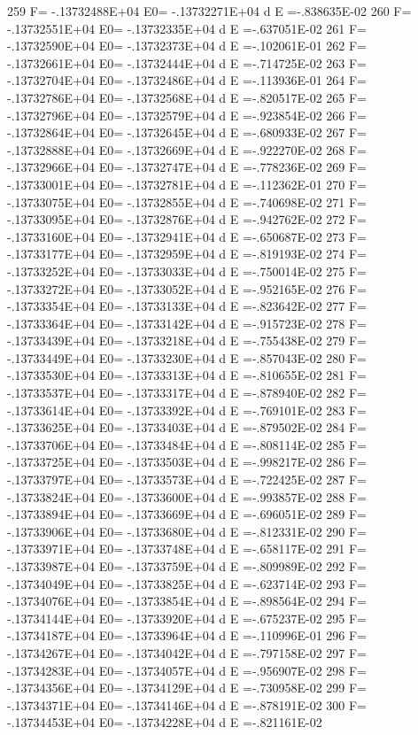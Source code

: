  259 F= -.13732488E+04 E0= -.13732271E+04  d E =-.838635E-02
 260 F= -.13732551E+04 E0= -.13732335E+04  d E =-.637051E-02
 261 F= -.13732590E+04 E0= -.13732373E+04  d E =-.102061E-01
 262 F= -.13732661E+04 E0= -.13732444E+04  d E =-.714725E-02
 263 F= -.13732704E+04 E0= -.13732486E+04  d E =-.113936E-01
 264 F= -.13732786E+04 E0= -.13732568E+04  d E =-.820517E-02
 265 F= -.13732796E+04 E0= -.13732579E+04  d E =-.923854E-02
 266 F= -.13732864E+04 E0= -.13732645E+04  d E =-.680933E-02
 267 F= -.13732888E+04 E0= -.13732669E+04  d E =-.922270E-02
 268 F= -.13732966E+04 E0= -.13732747E+04  d E =-.778236E-02
 269 F= -.13733001E+04 E0= -.13732781E+04  d E =-.112362E-01
 270 F= -.13733075E+04 E0= -.13732855E+04  d E =-.740698E-02
 271 F= -.13733095E+04 E0= -.13732876E+04  d E =-.942762E-02
 272 F= -.13733160E+04 E0= -.13732941E+04  d E =-.650687E-02
 273 F= -.13733177E+04 E0= -.13732959E+04  d E =-.819193E-02
 274 F= -.13733252E+04 E0= -.13733033E+04  d E =-.750014E-02
 275 F= -.13733272E+04 E0= -.13733052E+04  d E =-.952165E-02
 276 F= -.13733354E+04 E0= -.13733133E+04  d E =-.823642E-02
 277 F= -.13733364E+04 E0= -.13733142E+04  d E =-.915723E-02
 278 F= -.13733439E+04 E0= -.13733218E+04  d E =-.755438E-02
 279 F= -.13733449E+04 E0= -.13733230E+04  d E =-.857043E-02
 280 F= -.13733530E+04 E0= -.13733313E+04  d E =-.810655E-02
 281 F= -.13733537E+04 E0= -.13733317E+04  d E =-.878940E-02
 282 F= -.13733614E+04 E0= -.13733392E+04  d E =-.769101E-02
 283 F= -.13733625E+04 E0= -.13733403E+04  d E =-.879502E-02
 284 F= -.13733706E+04 E0= -.13733484E+04  d E =-.808114E-02
 285 F= -.13733725E+04 E0= -.13733503E+04  d E =-.998217E-02
 286 F= -.13733797E+04 E0= -.13733573E+04  d E =-.722425E-02
 287 F= -.13733824E+04 E0= -.13733600E+04  d E =-.993857E-02
 288 F= -.13733894E+04 E0= -.13733669E+04  d E =-.696051E-02
 289 F= -.13733906E+04 E0= -.13733680E+04  d E =-.812331E-02
 290 F= -.13733971E+04 E0= -.13733748E+04  d E =-.658117E-02
 291 F= -.13733987E+04 E0= -.13733759E+04  d E =-.809989E-02
 292 F= -.13734049E+04 E0= -.13733825E+04  d E =-.623714E-02
 293 F= -.13734076E+04 E0= -.13733854E+04  d E =-.898564E-02
 294 F= -.13734144E+04 E0= -.13733920E+04  d E =-.675237E-02
 295 F= -.13734187E+04 E0= -.13733964E+04  d E =-.110996E-01
 296 F= -.13734267E+04 E0= -.13734042E+04  d E =-.797158E-02
 297 F= -.13734283E+04 E0= -.13734057E+04  d E =-.956907E-02
 298 F= -.13734356E+04 E0= -.13734129E+04  d E =-.730958E-02
 299 F= -.13734371E+04 E0= -.13734146E+04  d E =-.878191E-02
 300 F= -.13734453E+04 E0= -.13734228E+04  d E =-.821161E-02

